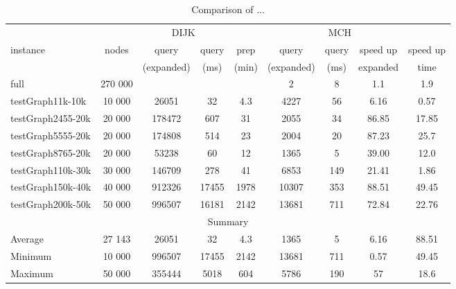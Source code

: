 \begin{table}
\caption{Comparison of ...}
\label{table1}
\begin{tabular}{l|c|cc|ccccc}
 & & \multicolumn{2}{c}{DIJK} & \multicolumn{5}{c}{MCH} \\ \cline{3-6}
instance & nodes & query & query & prep & query & query & speed up & speed up \\ \hline
& & (expanded) & (ms) & (min) & (expanded) & (ms) & expanded & time \\ \hline
full & 270 000 & & & &  2 & 8 & 1.1 & 1.9 \\ \hline
testGraph11k-10k & 10 000 & 26051 & 32 & 4.3 & 4227 & 56 & 6.16 & 0.57 \\ \hline
testGraph2455-20k & 20 000 & 178472 & 607 & 31 & 2055 & 34 & 86.85 & 17.85 \\ \hline
testGraph5555-20k & 20 000 & 174808 & 514 & 23 & 2004 & 20 & 87.23 & 25.7 \\ \hline
testGraph8765-20k & 20 000 & 53238 & 60 & 12 & 1365 & 5 & 39.00 & 12.0 \\ \hline
testGraph110k-30k & 30 000 & 146709 & 278 & 41 & 6853 & 149 & 21.41 & 1.86 \\ \hline
testGraph150k-40k & 40 000 & 912326 & 17455 & 1978 & 10307 & 353 & 88.51& 49.45 \\ \hline
testGraph200k-50k & 50 000 & 996507 & 16181 & 2142 & 13681 & 711 & 72.84& 22.76 \\ \hline

\multicolumn{9}{c}{Summary} \\ \hline
Average & 27 143 & 26051 & 32 & 4.3 & 1365 & 5 & 6.16 & 88.51 \\ \hline
Minimum & 10 000 & 996507 & 17455 & 2142 & 13681 & 711 & 0.57 & 49.45\\ \hline
Maximum & 50 000 & 355444 & 5018 & 604 & 5786 & 190 & 57 & 18.6 \\ \hline
\end{tabular}
\end{table}



